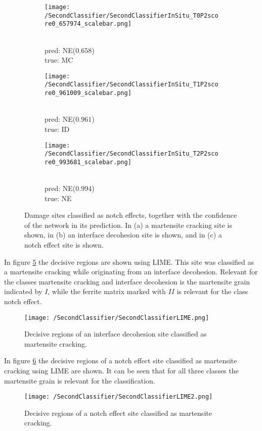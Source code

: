 \begin{figure}[H]
\centering
\begin{subfigure}{0.3\textwidth}
\texttt{[image: /SecondClassifier/SecondClassifierInSitu\_T0P2score0\_657974\_scalebar.png]}
\caption{\\pred: NE($0.658$) \\ true: MC}
\label{sub:InSituNotchEffectSamplesM}
\end{subfigure}
\begin{subfigure}{0.3\textwidth}
\texttt{[image: /SecondClassifier/SecondClassifierInSitu\_T1P2score0\_961009\_scalebar.png]}
\caption{\\pred: NE($0.961$) \\ true: ID}
\label{sub:InSituNotchEffectSamplesI}
\end{subfigure}
\begin{subfigure}{0.3\textwidth}
\texttt{[image: /SecondClassifier/SecondClassifierInSitu\_T2P2score0\_993681\_scalebar.png]}
\caption{\\pred: NE($0.994$) \\ true: NE}
\label{sub:InSituNotchEffectSamplesN}
\end{subfigure}
\caption{Damage sites classified as notch effects, together with the confidence of the network in its prediction. In (a) a martensite cracking site is shown, in (b) an interface decohesion site is shown, and in (c) a notch effect site is shown. }
\label{fig:InSituNotchEffectSamples}
\end{figure}

In figure \ref{fig:SecondCNNLIME1} the decisive regions are shown using LIME. This site was classified as a martensite cracking while originating from an interface decohesion. Relevant for the classes martensite cracking and interface decohesion is the martensite grain indicated by $I$, while the ferrite matrix marked with $II$ is relevant for the class notch effect. \\


\begin{figure}[H]
\centering
\texttt{[image: /SecondClassifier/SecondClassifierLIME.png]}
\caption{Decisive regions of an interface decohesion site classified as martensite cracking.}
\label{fig:SecondCNNLIME1}
\end{figure}

In figure \ref{fig:SecondCNNLIME2} the decisive regions of a notch effect site classified as martensite cracking using LIME are shown. It can be seen that for all three classes the martensite grain is relevant for the classification. \\
\begin{figure}[H]
\centering
\texttt{[image: /SecondClassifier/SecondClassifierLIME2.png]}
\caption{Decisive regions of a notch effect site classified as martensite cracking.}
\label{fig:SecondCNNLIME2}
\end{figure}

